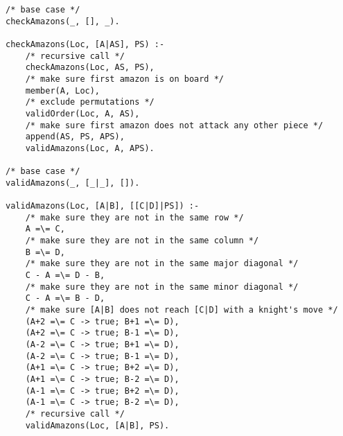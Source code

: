 \documentclass{article}
\begin{document}
\begin{verbatim}
/* base case */
checkAmazons(_, [], _).

checkAmazons(Loc, [A|AS], PS) :-
	/* recursive call */
	checkAmazons(Loc, AS, PS),
	/* make sure first amazon is on board */
	member(A, Loc),
	/* exclude permutations */
	validOrder(Loc, A, AS),
	/* make sure first amazon does not attack any other piece */
	append(AS, PS, APS),
	validAmazons(Loc, A, APS).

/* base case */
validAmazons(_, [_|_], []).

validAmazons(Loc, [A|B], [[C|D]|PS]) :-
	/* make sure they are not in the same row */
	A =\= C,
	/* make sure they are not in the same column */
	B =\= D,
	/* make sure they are not in the same major diagonal */
	C - A =\= D - B,
	/* make sure they are not in the same minor diagonal */
	C - A =\= B - D,
	/* make sure [A|B] does not reach [C|D] with a knight's move */
	(A+2 =\= C -> true; B+1 =\= D),
	(A+2 =\= C -> true; B-1 =\= D),
	(A-2 =\= C -> true; B+1 =\= D),
	(A-2 =\= C -> true; B-1 =\= D),
	(A+1 =\= C -> true; B+2 =\= D),
	(A+1 =\= C -> true; B-2 =\= D),
	(A-1 =\= C -> true; B+2 =\= D),
	(A-1 =\= C -> true; B-2 =\= D),
	/* recursive call */
	validAmazons(Loc, [A|B], PS).
\end{verbatim}
\end{document}
